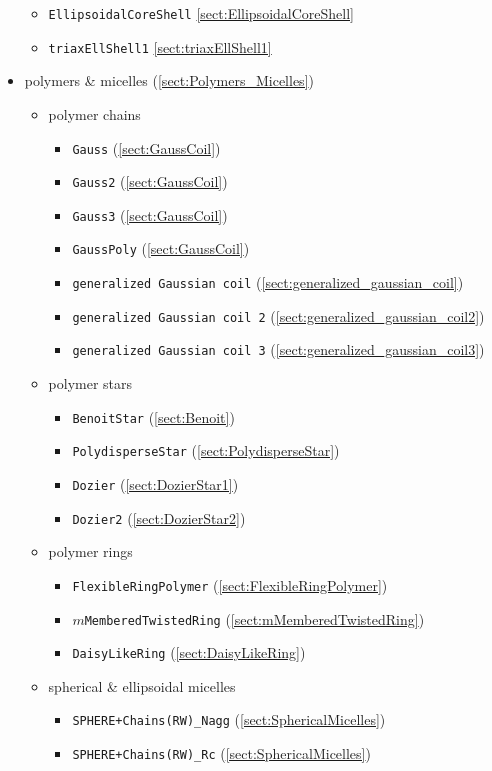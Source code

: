 \begin{itemize}
\begin{itemize}
\item \texttt{EllipsoidalCoreShell} \ref{sect:EllipsoidalCoreShell}
\item \texttt{triaxEllShell1} \ref{sect:triaxEllShell1}
\end{itemize}
\item polymers \& micelles (\ref{sect:Polymers_Micelles})
\begin{itemize}
\item polymer chains
\begin{itemize}
\item \texttt{Gauss} (\ref{sect:GaussCoil})
\item \texttt{Gauss2} (\ref{sect:GaussCoil})
\item \texttt{Gauss3} (\ref{sect:GaussCoil})
\item \texttt{GaussPoly} (\ref{sect:GaussCoil})
\item \texttt{generalized Gaussian coil} (\ref{sect:generalized_gaussian_coil})
\item \texttt{generalized Gaussian coil 2} (\ref{sect:generalized_gaussian_coil2})
\item \texttt{generalized Gaussian coil 3} (\ref{sect:generalized_gaussian_coil3})
\end{itemize}
\item polymer stars
\begin{itemize}
\item \texttt{BenoitStar} (\ref{sect:Benoit})
\item \texttt{PolydisperseStar} (\ref{sect:PolydisperseStar})
\item \texttt{Dozier} (\ref{sect:DozierStar1})
\item \texttt{Dozier2} (\ref{sect:DozierStar2})
\end{itemize}
\item polymer rings
\begin{itemize}
\item \texttt{FlexibleRingPolymer} (\ref{sect:FlexibleRingPolymer})
\item \texttt{$m$MemberedTwistedRing} (\ref{sect:mMemberedTwistedRing})
\item \texttt{DaisyLikeRing} (\ref{sect:DaisyLikeRing})
\end{itemize}
\item spherical \& ellipsoidal micelles
\begin{itemize}
\item \texttt{SPHERE+Chains(RW)\_Nagg} (\ref{sect:SphericalMicelles})
\item \texttt{SPHERE+Chains(RW)\_Rc} (\ref{sect:SphericalMicelles})

\end{itemize}
\end{itemize}
\end{itemize}
